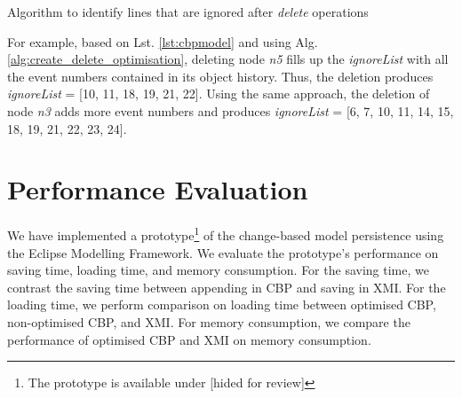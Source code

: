 \documentclass{llncs}
\begin{document}
\begin{algorithm}
\begin{small}
\end{small}
\caption{Algorithm to identify lines that are ignored after \emph{delete} operations}
\label{alg:create_delete_optimisation}
\end{algorithm}

For example, based on Lst. \ref{lst:cbpmodel} and using Alg. \ref{alg:create_delete_optimisation}, deleting node \emph{n5} fills up the \emph{ignoreList} with all the event numbers contained in its object history. Thus, the deletion produces \emph{ignoreList} = [10, 11, 18, 19, 21, 22]. Using the same approach, the deletion of node \emph{n3} adds more event numbers and produces \emph{ignoreList} = [6, 7, 10, 11, 14, 15, 18, 19, 21, 22, 23, 24].

\section{Performance Evaluation}
\label{sec:performance_evaluation}
We have implemented a prototype\footnote{The prototype is available under [hided for review] %
} of the change-based model persistence using the Eclipse Modelling Framework. We evaluate the prototype's performance on saving time, loading time, and memory consumption. For the saving time, we contrast the saving time between appending in CBP and saving in XMI. For the loading time, we perform comparison on loading time between optimised CBP, non-optimised CBP, and XMI. For memory consumption, we compare the performance of optimised CBP and XMI on memory consumption.
\end{document}

